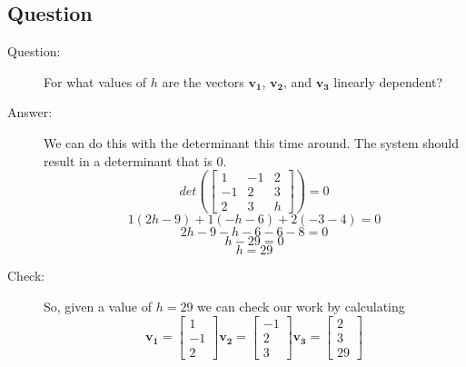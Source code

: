 \documentclass{article}
\begin{document}
                \subsection{Question}
                    \begin{description}
                        \item[Question:]
                            For what values of $h$ are the vectors 
                            $\mathbf{v_1}$, $\mathbf{v_2}$, and $\mathbf{v_3}$ 
                            linearly dependent?
                        \item[Answer:]
                            We can do this with the determinant this time around. The system
                            should result in a determinant that is $0$.
                            \[
                            det(
                                \begin{bmatrix}
                                    1 & -1 & 2 \\
                                    -1 & 2 & 3 \\
                                    2 & 3 & h
                                \end{bmatrix}
                            )
                            =0
                            \]
                            \[
                            1(2h-9)+1(-h-6)+2(-3-4)=0
                            \]
                            \[
                            2h-9-h-6-6-8=0
                            \]
                            \[
                            h-29=0
                            \]
                            \[
                            h=29
                            \]
                        \item[Check:]
                            So, given a value of $h=29$ we can check our work by calculating
                            \[
                            \mathbf{v_1}=\begin{bmatrix}1\\-1\\2\end{bmatrix}
                            \mathbf{v_2}=\begin{bmatrix}-1\\2\\3\end{bmatrix}
                            \mathbf{v_3}=\begin{bmatrix}2\\3\\29\end{bmatrix}
\]
\end{description}
\end{document}
